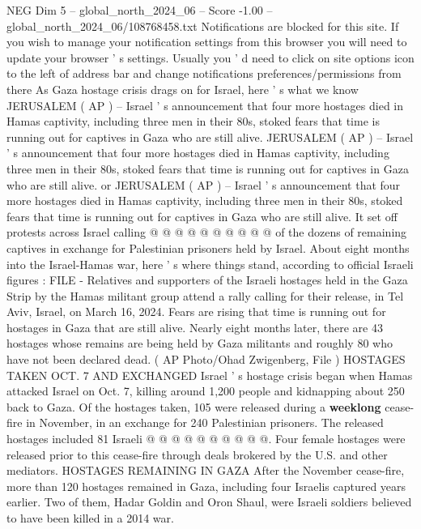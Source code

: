 \begin{textsample}{NEG Dim 5 – global\_north\_2024\_06 – Score -1.00 – global\_north\_2024\_06/108768458.txt}  \label{ex:f5_neg_131}
Notifications are blocked for this site.
If you wish to manage your notification settings from this browser you will need to update your browser ' s settings.
Usually you ' d need to click on site options icon to the left of address bar and change notifications preferences/permissions from there As Gaza hostage crisis drags on for Israel, here ' s what we know JERUSALEM ( AP ) -- Israel ' s announcement that four more hostages died in Hamas captivity, including three men in their 80s, stoked fears that time is running out for captives in Gaza who are still alive.
JERUSALEM ( AP ) -- Israel ' s announcement that four more hostages died in Hamas captivity, including three men in their 80s, stoked fears that time is running out for captives in Gaza who are still alive. or JERUSALEM ( AP ) -- Israel ' s announcement that four more hostages died in Hamas captivity, including three men in their 80s, stoked fears that time is running out for captives in Gaza who are still alive.
It set off protests across Israel calling @ @ @ @ @ @ @ @ @ @ of the dozens of remaining captives in exchange for Palestinian prisoners held by Israel.
About eight months into the Israel-Hamas war, here ' s where things stand, according to official Israeli figures : FILE - Relatives and supporters of the Israeli hostages held in the Gaza Strip by the Hamas militant group attend a rally calling for their release, in Tel Aviv, Israel, on March 16, 2024.
Fears are rising that time is running out for hostages in Gaza that are still alive.
Nearly eight months later, there are 43 hostages whose remains are being held by Gaza militants and roughly 80 who have not been declared dead. ( AP Photo/Ohad Zwigenberg, File ) HOSTAGES TAKEN OCT. 7 AND EXCHANGED Israel ' s hostage crisis began when Hamas attacked Israel on Oct. 7, killing around 1,200 people and kidnapping about 250 back to Gaza.
Of the hostages taken, 105 were released during a \textbf{weeklong} cease-fire in November, in an exchange for 240 Palestinian prisoners.
The released hostages included 81 Israeli @ @ @ @ @ @ @ @ @ @.
Four female hostages were released prior to this cease-fire through deals brokered by the U.S. and other mediators.
HOSTAGES REMAINING IN GAZA After the November cease-fire, more than 120 hostages remained in Gaza, including four Israelis captured years earlier.
Two of them, Hadar Goldin and Oron Shaul, were Israeli soldiers believed to have been killed in a 2014 war.

\end{textsample}

